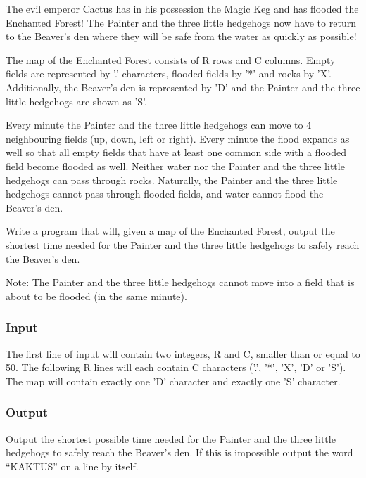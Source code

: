 

The evil emperor Cactus has in his possession the Magic Keg and has flooded the Enchanted Forest! The Painter and the three little hedgehogs now have to return to the Beaver's den where they will be safe from the water as quickly as possible!

The map of the Enchanted Forest consists of R rows and C columns. Empty fields are represented by '.' characters, flooded fields by '*' and rocks by 'X'. Additionally, the Beaver's den is represented by 'D' and the Painter and the three little hedgehogs are shown as 'S'.

Every minute the Painter and the three little hedgehogs can move to 4 neighbouring fields (up, down, left or right). Every minute the flood expands as well so that all empty fields that have at least one common side with a flooded field become flooded as well. Neither water nor the Painter and the three little hedgehogs can pass through rocks. Naturally, the Painter and the three little hedgehogs cannot pass through flooded fields, and water cannot flood the Beaver's den.

Write a program that will, given a map of the Enchanted Forest, output the shortest time needed for the Painter and the three little hedgehogs to safely reach the Beaver's den.

Note: The Painter and the three little hedgehogs cannot move into a field that is about to be flooded (in the same minute).

\subsubsection{Input}

The first line of input will contain two integers, R and C, smaller than or equal to 50. The following R lines will each contain C characters ('.', '*', 'X', 'D' or 'S'). The map will contain exactly one 'D' character and exactly one 'S' character.

\subsubsection{Output}

Output the shortest possible time needed for the Painter and the three little hedgehogs to safely reach the Beaver's den. If this is impossible output the word “KAKTUS” on a line by itself.

